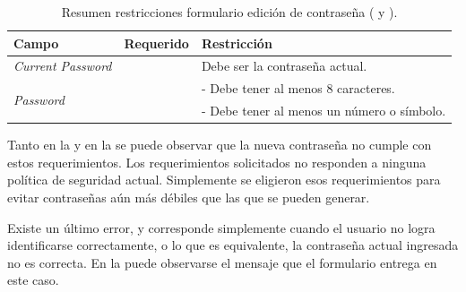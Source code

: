 		\begin{table}[h!]
		    \centering
			\begin{tabular}{ |l|c||l| }
				\hline Campo & Requerido & Restricción \\ \hline
				\multirow{1}{*}{\textit{Current Password}} 	&  \checkmark 					&  Debe ser la contraseña actual.\\ \hline
				\multirow{2}{*}{\textit{Password}} 			&  \multirow{2}{*}{\checkmark}	&  - Debe tener al menos 8 caracteres.\\
															&  								&  - Debe tener al menos un número o símbolo.\\ \hline
			\end{tabular}
		 	\caption{Resumen restricciones formulario edición de contraseña (  y ).}
		    \label{tab:profile:form:restrictions:update_password}
		\end{table}


		Tanto en la  y en la  se puede observar que la nueva contraseña no cumple con estos requerimientos.
		Los requerimientos solicitados no responden a ninguna política de seguridad actual. Simplemente se eligieron esos requerimientos para evitar contraseñas aún más débiles que las que se pueden generar.


		Existe un último error, y corresponde simplemente cuando el usuario no logra identificarse correctamente, o lo que es equivalente, la contraseña actual ingresada no es correcta. En la  puede observarse el mensaje que el formulario entrega en este caso.









